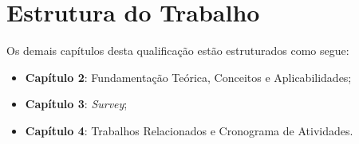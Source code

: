 \section{Estrutura do Trabalho}\label{sec:estruturadotrabalho}
Os demais capítulos desta qualificação estão estruturados como segue: 
\begin{itemize}
\item \textbf{Capítulo 2}: Fundamentação Teórica, Conceitos e Aplicabilidades;
\item \textbf{Capítulo 3}: \textit{Survey};
\item \textbf{Capítulo 4}: Trabalhos Relacionados e Cronograma de Atividades.
\end{itemize}